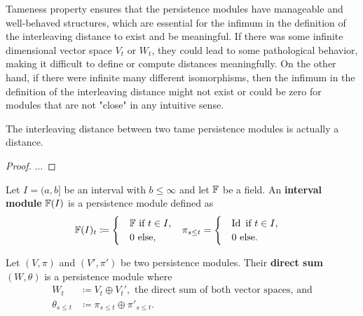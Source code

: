 Tameness property ensures that the persistence modules have manageable and well-behaved structures, which are essential for the infimum in the definition of the interleaving distance to exist and be meaningful. If there was some infinite dimensional vector space $ V_t $ or $ W_t$, they could lead to some pathological behavior, making it difficult to define or compute distances meaningfully. On the other hand, if there were infinite many different isomorphisms, then the infimum in the definition of the interleaving distance might not exist or could be zero for modules that are not "close" in any intuitive sense.

\begin{proposition}
    The interleaving distance between two tame persistence modules is actually a distance.
\end{proposition}
\begin{proof}
    ...
\end{proof}

\begin{definition}
    Let $ I = (a, b] $ be an interval with $ b \leq \infty $ and let $ \mathbb F $ be a field. An {\bf interval module} $\mathbb F(I)$ is a persistence module defined as
    \begin{align}
        & \mathbb F(I)_t \coloneq \begin{cases}
            &\mathbb F \text{ if } t \in I, \\
            &0 \text{ else}, 
        \end{cases}
        &
        & \pi_{s \leq t} = \begin{cases}
            & \operatorname{Id} \text{ if } t \in I, \\
            &0 \text{ else}.
        \end{cases}
    \end{align}
\end{definition}

\begin{definition}
    Let $ (V, \pi) $ and $ (V', \pi') $ be two persistence modules. Their {\bf direct sum} $ (W, \theta) $ is a persistence module where
    \begin{align}
        W_t &\coloneq V_t \oplus V_t', \text{ the direct sum of both vector spaces, and} \\
        \theta_{s \leq t} &\coloneq \pi_{s \leq t} \oplus \pi'_{s \leq t}.
    \end{align}
\end{definition}

